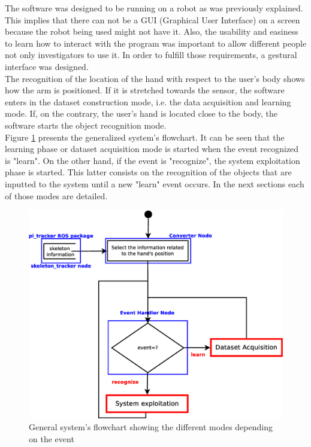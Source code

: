 The software was designed to be running on a robot as was previously explained. 
This implies that there can not be a GUI (Graphical User Interface) on a screen because the robot being used might not have it. 
Also, the usability and easiness to learn how to interact with the program was important to allow different people not only investigators to use it. 
In order to fulfill those requirements, a gestural interface was designed. 
\\

The recognition of the location of the hand with respect to the user's body shows how the arm is positioned. 
If it is stretched towards the sensor, the software enters in the dataset construction mode, i.e. the data acquisition and learning mode. 
If, on the contrary, the user's hand is located close to the body, the software starts the object recognition mode. 
\\

Figure \ref{flowchart1} presents the generalized system's flowchart. 
It can be seen that the learning phase or dataset acquisition mode is started when the event recognized is "learn". 
On the other hand, if the event is "recognize", the system exploitation phase is started. 
This latter consists on the recognition of the objects that are inputted to the system until a new "learn" event occurs. 
In the next sections each of those modes are detailed. 


\begin{figure}[H]
	\begin{center}
\includegraphics[width=0.8\linewidth]{img/diagrams/flowchart1.eps}
	\caption[General system's flowchart]{General system's flowchart showing the different modes depending on the event}
	\label{flowchart1}
	\end{center}
\end{figure}



